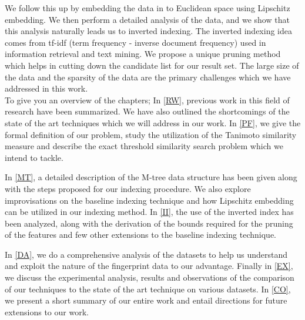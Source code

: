 We follow this up by embedding the data in to Euclidean space using Lipschitz embedding. We then perform a detailed analysis of the data, and we show that this analysis naturally leads us to inverted indexing. The inverted indexing idea comes from tf-idf (term frequency - inverse document frequency) used in information retrieval and text mining. We propose a unique pruning method which helps in cutting down the candidate list for our result set.  The large size of the data and the sparsity of the data are the primary challenges which we have addressed in this work.\\

To give you an overview of the chapters; In \autoref{RW}, previous work in this field of research have been summarized. We have also outlined the shortcomings of the state of the art techniques which we will address in our work. In \autoref{PF}, we give the formal definition of our problem, study the utilization of the Tanimoto similarity measure and describe the exact threshold similarity search problem which we intend to tackle.

In \autoref{MT}, a detailed description of the M-tree data structure has been given along with the steps proposed for our indexing procedure. We also explore improvisations on the baseline indexing technique and how Lipschitz embedding can be utilized in our indexing method. In \autoref{II}, the use of the inverted index has been analyzed, along with the derivation of the bounds required for the pruning of the features and few other extensions to the baseline indexing technique.

	In \autoref{DA}, we do a comprehensive analysis of the datasets to help us understand and exploit the nature of the fingerprint data to our advantage. Finally in \autoref{EX}, we discuss the experimental analysis, results and observations of the comparison of our techniques to the state of the art technique on various datasets. In \autoref{CO}, we present a short summary of our entire work and entail directions for future extensions to our work.



	